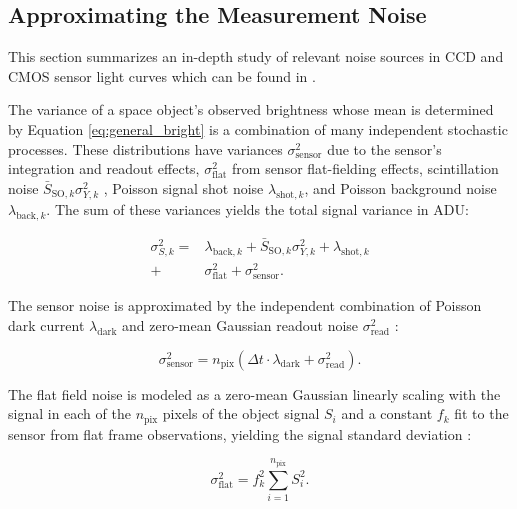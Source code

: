 \documentclass[a4paper,twocolumn]{spaceDebrisC} %
\begin{document}
\subsection{Approximating the Measurement Noise}

This section summarizes an in-depth study of relevant noise sources in CCD and CMOS sensor light curves which can be found in \cite{robinson2025twin}.

The variance of a space object's observed brightness whose mean is determined by Equation \ref{eq:general_bright} is a combination of many independent stochastic processes. These distributions have variances $\sigma^2_\text{sensor}$ due to the sensor's integration and readout effects, $\sigma^2_\text{flat}$ from sensor flat-fielding effects, scintillation noise $\bar{S}_{\text{SO},k} \sigma^2_{Y,k}$ \cite{osborn2015}, Poisson signal shot noise $\lambda_{\text{shot},k}$, and Poisson background noise $\lambda_{\text{back},k}$. The sum of these variances yields the total signal variance in ADU:

\begin{equation} \label{eq:sigma_total}
  \begin{split}
  \sigma^2_{S,k} = &\lambda_{\text{back},k} + \bar{S}_{\text{SO},k} \sigma^2_{Y,k} + \lambda_{\text{shot},k} \\ + &\sigma^2_\text{flat} + \sigma^2_\text{sensor}.
  \end{split}
\end{equation}

The sensor noise is approximated by the independent combination of Poisson dark current $\lambda_\text{dark}$ and zero-mean Gaussian readout noise $\sigma_\text{read}^2$ \cite{krag2003}:

\begin{equation} \label{eq:sensor_noise}
  \sigma_\text{sensor}^2 = n_\text{pix} \left( \Delta t \cdot \lambda_\text{dark} + \sigma_\text{read}^2 \right).
\end{equation}

The flat field noise is modeled as a zero-mean Gaussian linearly scaling with the signal in each of the $n_\text{pix}$ pixels of the object signal $S_i$ and a constant $f_k$ fit to the sensor from flat frame observations, yielding the signal standard deviation \cite{newberry1996}: 

\begin{equation}
  \sigma_\text{flat}^2 = f_k^2 \sum_{i=1}^{n_\text{pix}} S_i^2.
\end{equation}
\end{document}
